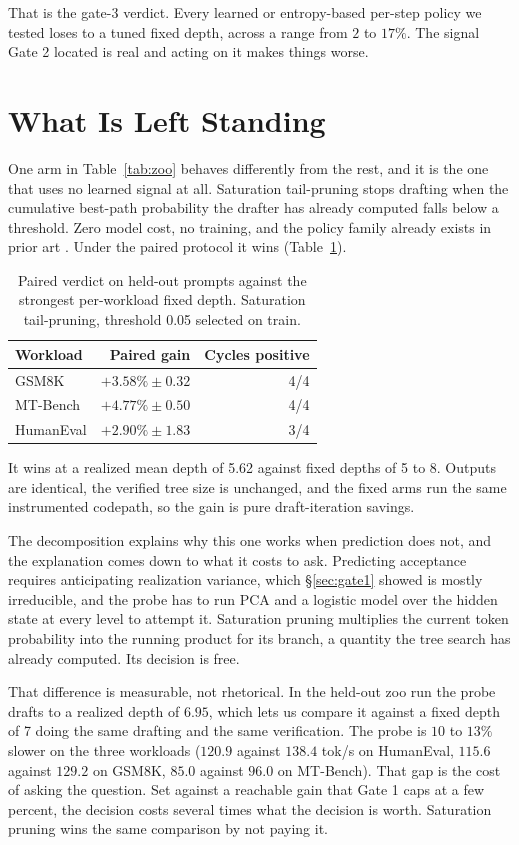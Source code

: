 \documentclass[conference]{IEEEtran}
\begin{document}
That is the gate-3 verdict. Every learned or entropy-based per-step policy we tested loses to
a tuned fixed depth, across a range from $2$ to $17\%$. The signal Gate 2 located is real and
acting on it makes things worse.

\section{What Is Left Standing}
\label{sec:survivor}
One arm in Table~\ref{tab:zoo} behaves differently from the rest, and it is the one that uses
no learned signal at all. Saturation tail-pruning stops drafting when the cumulative best-path
probability the drafter has already computed falls below a threshold. Zero model cost, no
training, and the policy family already exists in prior art \cite{saddle,pacer,ddd}. Under the
paired protocol it wins (Table~\ref{tab:paired}).

\begin{table}[t]
\caption{Paired verdict on held-out prompts against the strongest per-workload fixed depth.
Saturation tail-pruning, threshold 0.05 selected on train.}
\label{tab:paired}
\centering
\small
\begin{tabular}{lrr}
\toprule
Workload & Paired gain & Cycles positive \\
\midrule
GSM8K & $+3.58\% \pm 0.32$ & 4/4 \\
MT-Bench & $+4.77\% \pm 0.50$ & 4/4 \\
HumanEval & $+2.90\% \pm 1.83$ & 3/4 \\
\bottomrule
\end{tabular}
\end{table}

It wins at a realized mean depth of 5.62 against fixed depths of 5 to 8. Outputs are identical, the
verified tree size is unchanged, and the fixed arms run the same instrumented codepath, so the
gain is pure draft-iteration savings.

The decomposition explains why this one works when prediction does not, and the explanation
comes down to what it costs to ask. Predicting acceptance requires anticipating realization
variance, which \S\ref{sec:gate1} showed is mostly irreducible, and the probe has to run PCA
and a logistic model over the hidden state at every level to attempt it. Saturation pruning
multiplies the current token probability into the running product for its branch, a quantity
the tree search has already computed. Its decision is free.

That difference is measurable, not rhetorical. In the held-out zoo run the probe drafts
to a realized depth of $6.95$, which lets us compare it against a fixed depth of 7 doing the
same drafting and the same verification. The probe is $10$ to $13\%$ slower on the three
workloads ($120.9$ against $138.4$ tok/s on HumanEval, $115.6$ against $129.2$ on GSM8K, $85.0$
against $96.0$ on MT-Bench). That gap is the cost of asking the question. Set against a
reachable gain that Gate 1 caps at a few percent, the decision costs several times what the
decision is worth. Saturation pruning wins the same comparison by not paying it.
\end{document}
